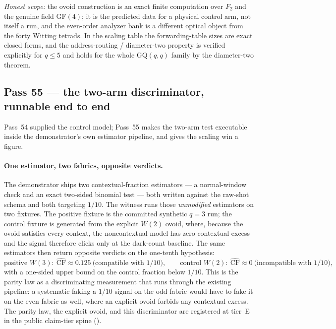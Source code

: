 \documentclass[11pt]{article}
\begin{document}
\emph{Honest scope:} the ovoid construction is an exact finite computation over
\(F_2\) and the genuine field \(\mathrm{GF}(4)\); it is the predicted data for a
physical control arm, not itself a run, and the even-order analyzer bank is a
different optical object from the forty Witting tetrads.  In the scaling table the
forwarding-table sizes are exact closed forms, and the address-routing /
diameter-two property is verified explicitly for \(q\le5\) and holds for the whole
\(\mathrm{GQ}(q,q)\) family by the diameter-two theorem.

\subsection{Pass 55 --- the two-arm discriminator, runnable end to end}
\label{sec:capstone-fiftyfive}

Pass~54 supplied the control model; Pass~55 makes the two-arm test executable
inside the demonstrator's own estimator pipeline, and gives the scaling win a
figure.

\paragraph{One estimator, two fabrics, opposite verdicts.}  The demonstrator
ships two contextual-fraction estimators --- a normal-window check and an exact
two-sided binomial test --- both written against the raw-shot schema and both
targeting \(1/10\).  The witness  runs those
\emph{unmodified} estimators on two fixtures.  The positive fixture is the
committed synthetic \(q=3\) run; the control fixture is generated from the
explicit \(W(2)\) ovoid, where, because the ovoid satisfies every context, the
noncontextual model has zero contextual excess and the signal therefore clicks
only at the dark-count baseline.  The same estimators then return opposite
verdicts on the one-tenth hypothesis:
\[
  \text{positive } W(3):\ \widehat{\mathrm{CF}}\approx 0.125\ \text{(compatible with }1/10\text{)},
  \qquad
  \text{control } W(2):\ \widehat{\mathrm{CF}}\approx 0\ \text{(incompatible with }1/10\text{)},
\]
with a one-sided upper bound on the control fraction below \(1/10\).  This is the
parity law as a discriminating measurement that runs through the existing
pipeline: a systematic faking a \(1/10\) signal on the odd fabric would have to
fake it on the even fabric as well, where an explicit ovoid forbids any
contextual excess.  The parity law, the explicit ovoid, and this discriminator
are registered at tier~E in the public claim-tier spine
().
\end{document}
